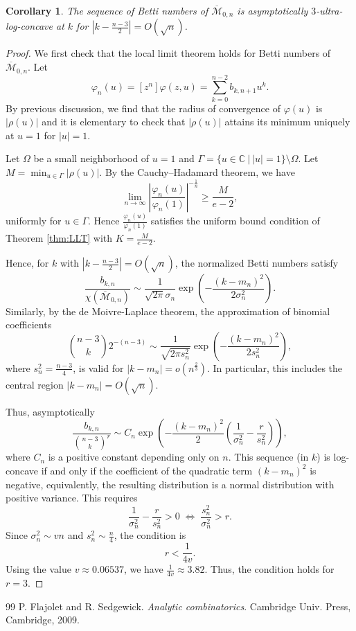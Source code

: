 \documentclass[10pt,a4paper]{amsart}
\newtheorem{corollary}{Corollary}
\def\CC{\mathbb{C}}
\def\beq{\begin{equation}}
\def\cM{{\cal M}}
\newcommand{\cal}{\mathcal}
\def\eeq{\end{equation}}
\def\mzn{\overline{\cM}_{0,n} }
\begin{document}
\begin{corollary}
  The sequence of Betti numbers of $\mzn$ is asymptotically $3$-ultra-log-concave at $k$ for $|k-\frac{n-3}{2}|=O(\sqrt{n})$.
\end{corollary}

\begin{proof}
  We first check that the local limit theorem holds for Betti numbers of $\mzn$. Let \[\varphi_n(u)=[z^{n}]\varphi(z, u)=\sum_{k=0}^{n-2}b_{k, n+1} u^k.\] By previous discussion, we find that the radius of convergence of $\varphi(u)$ is $|\rho(u)|$ and it is elementary to check that $|\rho(u)|$ attains its minimum uniquely at $u=1$ for $|u|=1$. 
  
  Let $\Omega$ be a small neighborhood of $u=1$ and $\Gamma=\{u\in \CC ~|~ |u|=1\}\setminus\Omega$. Let $M=\min_{u\in \Gamma}|\rho(u)|$. By the Cauchy–Hadamard theorem, we have \[ \lim_{n\to \infty} \left|\frac{\varphi_n(u)}{\varphi_n(1)}\right|^{-\frac{1}{n}} \ge \frac{M}{e-2}, \]
  uniformly for $u \in \Gamma$. Hence $\frac{\varphi_n(u)}{\varphi_n(1)}$ satisfies the uniform bound condition of Theorem \ref{thm:LLT} with $K=\frac{M}{e-2}$.

  Hence, for $k$ with $|k-\frac{n-3}{2}|=O(\sqrt{n})$, the normalized Betti numbers satisfy
  \beq\label{eq:bettiasymp} \frac{b_{k,n}}{\chi(\mzn)} \sim \frac{1}{\sqrt{2\pi}\sigma_n} \exp\left({-\frac{(k-m_n)^2}{2\sigma_n^2}}\right). \eeq
  Similarly, by the de Moivre-Laplace theorem, the approximation of binomial coefficients
  \[ \binom{n-3}{k} 2^{-(n-3)} \sim \frac{1}{\sqrt{2\pi s_n^2}} \exp\left({-\frac{(k-m_n)^2}{2 s_n^2}}\right), \]
  where $s_n^2 = \frac{n-3}{4}$, is valid for $|k-m_n|=o(n^{\frac{2}{3}})$. In particular, this includes the central region $|k-m_n|=O(\sqrt{n})$.

  Thus, asymptotically
  \[  \frac{b_{k,n}}{\binom{n-3}{k}^r} \sim C_n \exp\left( -\frac{(k-m_n)^2}{2} \left( \frac{1}{\sigma_n^2}-\frac{r}{s_n^2} \right) \right), \]
 where $C_n$ is a positive constant depending only on $n$. This sequence (in $k$) is log-concave if and only if the coefficient of the quadratic term $(k-m_n)^2$ is negative, equivalently, the resulting distribution is a normal distribution with positive variance. This requires
  \[ \frac{1}{\sigma_n^2} - \frac{r}{s_n^2} > 0 \;\Leftrightarrow \; \frac{s_n^2}{\sigma_n^2} > r. \]
 Since $\sigma_n^2 \sim vn$ and $s_n^2 \sim \frac{n}{4}$, the condition is $$r < \frac{1}{4v}.$$ Using the value $v \approx 0.06537$, we have $\frac{1}{4v} \approx 3.82$. Thus, the condition holds for $r=3$.
\end{proof}

\begin{thebibliography}{99}
 P. Flajolet and R. Sedgewick. {\em Analytic combinatorics}. Cambridge Univ. Press, Cambridge, 2009.
\end{thebibliography}
\end{document}
